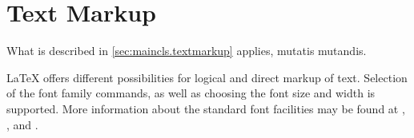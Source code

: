 \section{Text Markup}
\label{sec:\csname label@base\endcsname.textmarkup}%
\IgnoreThisfalse
\ifshortversion\IgnoreThistrue\ifCommonmaincls\IgnoreThisfalse\fi\fi%
\ifIgnoreThis %
What is described in
\autoref{sec:maincls.textmarkup} applies, mutatis mutandis.
\else %
%
%

{\LaTeX} offers different possibilities for logical and direct
markup of text.
Selection of the
font family commands, as well as choosing the font size and width is
supported. More information about the standard font facilities may be found at
\cite{lshort}, \cite{latex:usrguide}, and \cite{latex:fntguide}.


